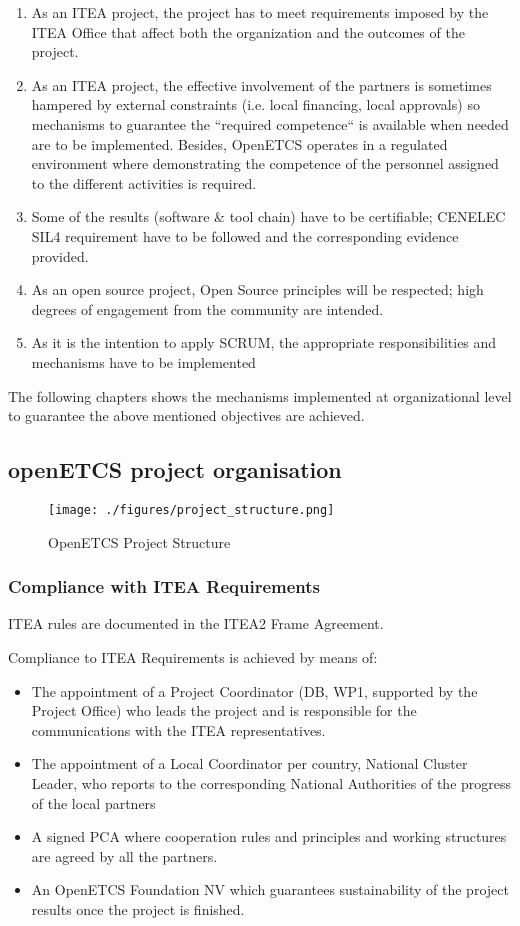 \documentclass{template/openetcs_article}
\begin{document}
\begin{enumerate}
\item As an ITEA project, the project has to meet requirements imposed by the ITEA Office that affect both the organization and the outcomes of the project.
\item As an ITEA project, the effective involvement of the partners is sometimes hampered by external constraints (i.e. local financing, local approvals) so mechanisms to guarantee the “required competence“ is available when needed are to be implemented. Besides, OpenETCS operates in a regulated environment where demonstrating the competence of the personnel assigned to the different activities is required. 
\item Some of the results (software \& tool chain) have to be certifiable; CENELEC SIL4 requirement \citep{EN50128} have to be followed and the corresponding evidence provided. 
\item As an open source project, Open Source principles will be respected; high degrees of engagement from the community are intended.
\item As it is the intention to apply SCRUM, the appropriate responsibilities and mechanisms have to be implemented
\end{enumerate}

The following chapters shows the mechanisms implemented at organizational level to guarantee the above mentioned objectives are achieved.


\subsection{openETCS project organisation}

\begin{figure}[H]
\centering
\texttt{[image: ./figures/project\_structure.png]}
\caption{OpenETCS Project Structure}
\end{figure}

\subsubsection{Compliance with ITEA Requirements}
ITEA rules are documented in the ITEA2 Frame Agreement.

Compliance to ITEA Requirements is achieved by means of:
\begin{itemize}
\item The appointment of a Project Coordinator (DB, WP1, supported by the Project Office) who leads the project and is responsible for the communications with the ITEA representatives. 
\item The appointment of a Local Coordinator per country, National Cluster Leader, who reports to the corresponding National Authorities of the progress of the local partners
\item A signed PCA where cooperation rules and principles and working structures are agreed by all the partners.
\item An OpenETCS Foundation NV which guarantees sustainability of the project results once the project is finished.
\end{itemize}
\end{document}
